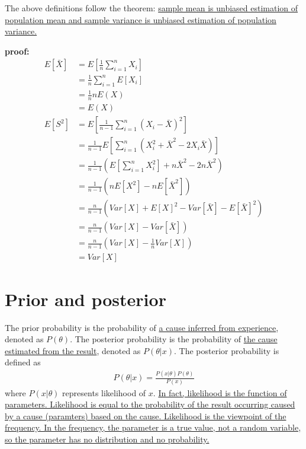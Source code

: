 \documentclass[10pt,onecolumn]{book}
\begin{document}
The above definitions follow the theorem: \uline{sample mean is unbiased estimation of population mean and sample variance is unbiased estimation of population variance.}　

\textbf{proof:}
\begin{equation}\label{eq:unbiased_estimation_of_sample_mean_and_variance}
\begin{split}
E[\bar{X}] &= E[\frac{1}{n} \sum_{i=1}^n X_i] \\
			&= \frac{1}{n} \sum_{i=1}^n E[X_i] \\
			&= \frac{1}{n} n E(X) \\
			&= E(X) \\
E[S^2] &= E[\frac{1}{n - 1} \sum_{i=1}^n(X_i - \bar{X})^2] \\
		&= \frac{1}{n-1}E[\sum_{i=1}^n(X_i ^ 2 + \bar{X} ^ 2 - 2 X_i \bar{X})] \\
		&= \frac{1}{n-1}(E[\sum_{i=1}^nX_i ^ 2] + n\bar{X}^2 - 2n\bar{X}^2) \\
		&= \frac{1}{n-1}(nE[X ^ 2] - nE[\bar{X}^2]) \\
		&= \frac{n}{n-1}(Var[X] + E[X]^2 - Var[\bar{X}] - E[\bar{X}]^2) \\
		&= \frac{n}{n-1}(Var[X] - Var[\bar{X}]) \\
		&= \frac{n}{n-1}(Var[X] - \frac{1}{n}Var[X]) \\
		&= Var[X]
\end{split}
\end{equation}

\section{Prior and posterior}
The prior probability is the probability of \uline{a cause inferred from experience}, denoted as $P(\theta)$. The posterior probability is the probability of \uline{the cause estimated from the result}, denoted as $P(\theta|x)$. The posterior probability is defined as 
\begin{equation}\label{eq:posterior}
\begin{split}
P(\theta|x) = \frac{P(x|\theta) P(\theta)}{P(x)}
\end{split}
\end{equation}
where $P(x|\theta)$ represents likelihood of $x$. \uline{In fact, likelihood is the function of parameters. Likelihood is equal to the probability of the result occurring caused by a cause (paramters) based on the cause. Likelihood is the viewpoint of the frequency. In the frequency, the parameter is a true value, not a random variable, so the parameter has no distribution and no probability.}
\end{document}

